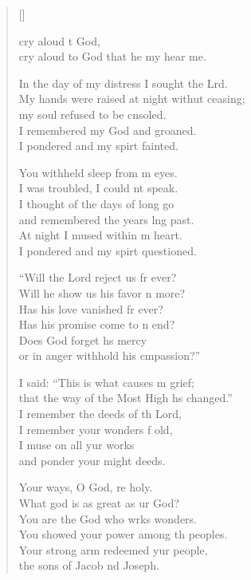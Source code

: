 \settowidth{\versewidth}{My hands were raised at night without ceasing; *}
\begin{verse}[\versewidth]
  \begin{patverse}
     cry aloud t God,\Med\\
cry aloud to God that he my hear me.

In the day of my distress I sought the Lrd.\Flex\\
My hands were raised at night withut ceasing;\Med\\
my soul refused to be cnsoled.\\
I remembered my God and  groaned.\Med\\
I pondered and my spir\pointup{\i}t fainted.

You withheld sleep from m eyes.\Med\\
I was troubled, I could nt speak.\\
I thought of the days of long go\Med\\
and remembered the years lng past.\\
At night I mused within m heart.\Med\\
I pondered and my spir\pointup{\i}t questioned.

“Will the Lord reject us fr ever?\Med\\
Will he show us his favor n more?\\
Has his love vanished fr ever?\Med\\
Has his promise come to n end?\\
Does God forget h\pointup{\i}s mercy\Med\\
or in anger withhold his cmpassion?”

I said: “This is what causes m grief;\Med\\
that the way of the Most High hs changed.”\\
I remember the deeds of th Lord,\Med\\
I remember your wonders f old,\\
I muse on all yur works\Med\\
and ponder your might deeds.

Your ways, O God, re holy.\Med\\
What god is as great as ur God?\\
You are the God who wrks wonders.\Med\\
You showed your power among th peoples.\\
Your strong arm redeemed yur people,\Med\\
the sons of Jacob nd Joseph.


\end{patverse}
\end{verse}
